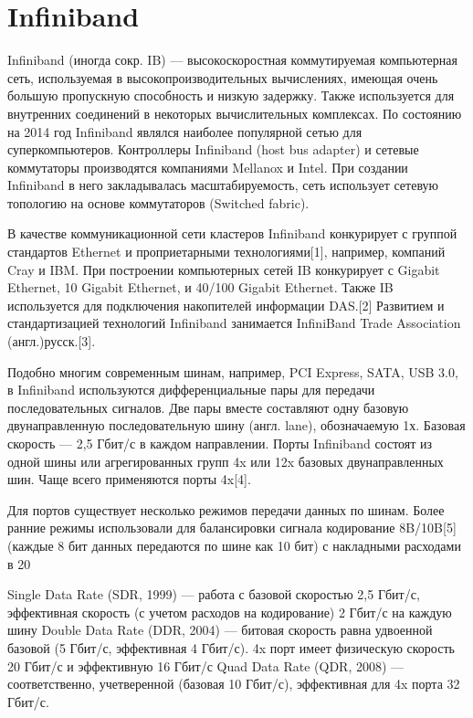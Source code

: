 \section{Infiniband}

Infiniband (иногда сокр. IB) — высокоскоростная коммутируемая компьютерная сеть, используемая в высокопроизводительных вычислениях, имеющая очень большую пропускную способность и низкую задержку. Также используется для внутренних соединений в некоторых вычислительных комплексах. По состоянию на 2014 год Infiniband являлся наиболее популярной сетью для суперкомпьютеров. Контроллеры Infiniband (host bus adapter) и сетевые коммутаторы производятся компаниями Mellanox и Intel. При создании Infiniband в него закладывалась масштабируемость, сеть использует сетевую топологию на основе коммутаторов (Switched fabric).

В качестве коммуникационной сети кластеров Infiniband конкурирует с группой стандартов Ethernet и проприетарными технологиями[1], например, компаний Cray и IBM. При построении компьютерных сетей IB конкурирует с Gigabit Ethernet, 10 Gigabit Ethernet, и 40/100 Gigabit Ethernet. Также IB используется для подключения накопителей информации DAS.[2] Развитием и стандартизацией технологий Infiniband занимается InfiniBand Trade Association (англ.)русск.[3]. 

Подобно многим современным шинам, например, PCI Express, SATA, USB 3.0, в Infiniband используются дифференциальные пары для передачи последовательных сигналов. Две пары вместе составляют одну базовую двунаправленную последовательную шину (англ. lane), обозначаемую 1х. Базовая скорость — 2,5 Гбит/с в каждом направлении. Порты Infiniband состоят из одной шины или агрегированных групп 4x или 12x базовых двунаправленных шин. Чаще всего применяются порты 4x[4].

Для портов существует несколько режимов передачи данных по шинам. Более ранние режимы использовали для балансировки сигнала кодирование 8B/10B[5] (каждые 8 бит данных передаются по шине как 10 бит) с накладными расходами в 20 %

Single Data Rate (SDR, 1999) — работа с базовой скоростью 2,5 Гбит/с, эффективная скорость (с учетом расходов на кодирование) 2 Гбит/с на каждую шину
Double Data Rate (DDR, 2004) — битовая скорость равна удвоенной базовой (5 Гбит/с, эффективная 4 Гбит/с). 4x порт имеет физическую скорость 20 Гбит/с и эффективную 16 Гбит/с
Quad Data Rate (QDR, 2008) — соответственно, учетверенной (базовая 10 Гбит/с), эффективная для 4x порта 32 Гбит/с.

